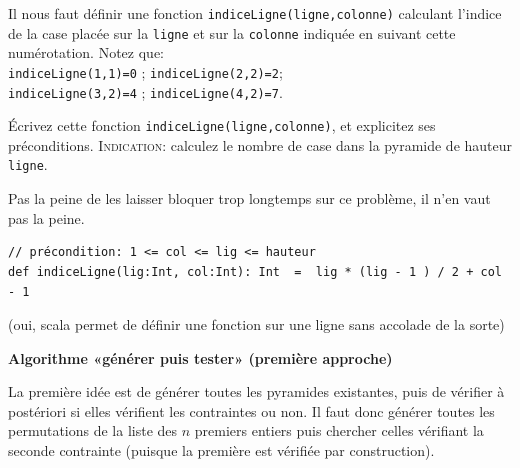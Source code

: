 \documentclass[10pt]{article}\usepackage[correction,nu]{esial}
\begin{document}
Il nous faut définir une fonction \texttt{indiceLigne(ligne,colonne)} calculant
l'indice de la case placée sur la \texttt{ligne} et sur la \texttt{colonne}
indiquée en suivant cette numérotation. Notez que:\\
\texttt{indiceLigne(1,1)=0} ; \texttt{indiceLigne(2,2)=2};\\
\texttt{indiceLigne(3,2)=4} ; \texttt{indiceLigne(4,2)=7}. 

\begin{Question}
  Écrivez cette fonction \texttt{indiceLigne(ligne,colonne)}, et explicitez ses préconditions.
  \noindent\textsc{Indication:} calculez le nombre de case dans la pyramide de
  hauteur \texttt{ligne}.
\end{Question}
\begin{Reponse}
  Pas la peine de les laisser bloquer trop longtemps sur ce problème, il n'en
  vaut pas la peine.

\begin{Verbatim}
// précondition: 1 <= col <= lig <= hauteur 
def indiceLigne(lig:Int, col:Int): Int  =  lig * (lig - 1 ) / 2 + col - 1
\end{Verbatim}
(oui, scala permet de définir une fonction sur une ligne sans accolade de la sorte)
\end{Reponse}




\begin{Exercice}\textbf{Algorithme «générer puis tester» (première approche)}

  \noindent La première idée est de générer toutes les pyramides existantes,
  puis de vérifier à postériori si elles vérifient les contraintes ou non. Il
  faut donc générer toutes les permutations de la liste des $n$ premiers
  entiers puis chercher celles vérifiant la seconde contrainte (puisque la
  première est vérifiée par construction).
\end{Exercice}
\end{document}
